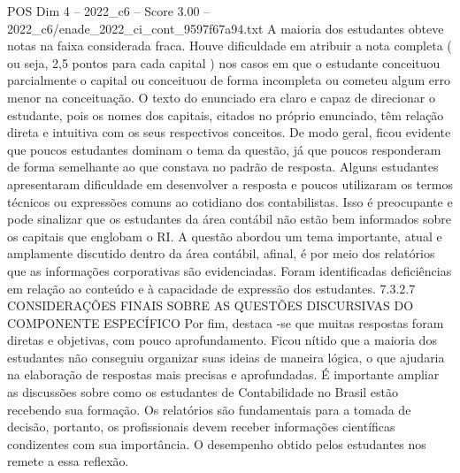 \begin{textsample}{POS Dim 4 – 2022\_c6 – Score 3.00 – 2022\_c6/enade\_2022\_ci\_cont\_9597f67a94.txt}
A maioria dos estudantes obteve notas na faixa considerada fraca.
Houve dificuldade em atribuir a nota completa ( ou seja, 2,5 pontos para cada capital ) nos casos em que o estudante conceituou parcialmente o capital ou conceituou de forma incompleta ou cometeu algum erro menor na conceituação.
O texto do enunciado era claro e capaz de direcionar o estudante, pois os nomes dos capitais, citados no próprio enunciado, têm relação direta e intuitiva com os seus respectivos conceitos.
De modo geral, ficou evidente que poucos estudantes dominam o tema da questão, já que poucos responderam de forma semelhante ao que constava no padrão de resposta.
Alguns estudantes apresentaram dificuldade em desenvolver a resposta e poucos utilizaram os termos técnicos ou expressões comuns ao cotidiano dos contabilistas.
Isso é preocupante e pode sinalizar que os estudantes da área contábil não estão bem informados sobre os capitais que englobam o RI.
A questão abordou um tema importante, atual e amplamente discutido dentro da área contábil, afinal, é por meio dos relatórios que as informações corporativas são evidenciadas.
Foram identificadas deficiências em relação ao conteúdo e à capacidade de expressão dos estudantes. 7.3.2.7 CONSIDERAÇÕES FINAIS SOBRE AS QUESTÕES DISCURSIVAS DO COMPONENTE ESPECÍFICO Por fim, destaca -se que muitas respostas foram diretas e objetivas, com pouco aprofundamento.
Ficou nítido que a maioria dos estudantes não conseguiu organizar suas ideias de maneira lógica, o que ajudaria na elaboração de respostas mais precisas e aprofundadas.
É importante ampliar as discussões sobre como os estudantes de Contabilidade no Brasil estão recebendo sua formação.
Os relatórios são fundamentais para a tomada de decisão, portanto, os profissionais devem receber informações científicas condizentes com sua importância.
O desempenho obtido pelos estudantes nos remete a essa reflexão.

\end{textsample}
